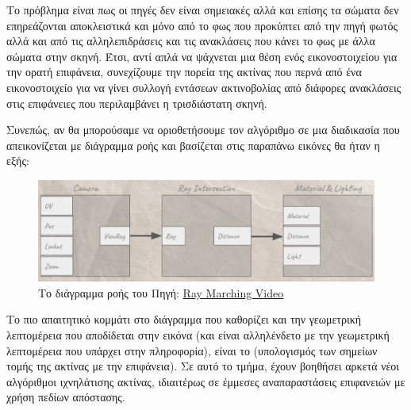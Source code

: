     Το πρόβλημα είναι πως οι πηγές δεν είναι σημειακές αλλά και επίσης τα σώματα δεν επηρεάζονται αποκλειστικά και μόνο από το φως που προκύπτει από την πηγή φωτός αλλά και από τις αλληλεπιδράσεις και τις ανακλάσεις που κάνει το φως με άλλα σώματα στην σκηνή. Έτσι, αντί απλά να ψάχνεται μια θέση ενός εικονοστοιχείου για την ορατή επιφάνεια, συνεχίζουμε την πορεία της ακτίνας που περνά από ένα εικονοστοιχείο για να γίνει συλλογή εντάσεων ακτινοβολίας από διάφορες ανακλάσεις στις επιφάνειες που περιλαμβάνει η τρισδιάστατη σκηνή. 
    
    
    Συνεπώς, αν θα μπορούσαμε να οριοθετήσουμε τον αλγόριθμο  σε μια διαδικασία που απεικονίζεται με διάγραμμα ροής και βασίζεται στις παραπάνω εικόνες θα ήταν η εξής:
    \begin{figure}[H]
        \centering
        \includegraphics[width=.6\linewidth]{images/chapter2_img/ray_tracing_pipline.jpg}
        \caption{Το διάγραμμα ροής του  Πηγή: \href{https://youtu.be/PGtv-dBi2wE?si=aUpxw89M65hnv-su}{Ray Marching Video}}
        \label{fig:ray_tracing_pipeline}
    \end{figure}
\par 
    Το πιο απαιτητικό κομμάτι στο διάγραμμα που καθορίζει και την γεωμετρική λεπτομέρεια που αποδίδεται στην εικόνα (και είναι αλληλένδετο με την γεωμετρική λεπτομέρεια που υπάρχει στην  πληροφορία), είναι το (υπολογισμός των σημείων τομής της ακτίνας με την επιφάνεια). Σε αυτό το τμήμα, έχουν βοηθήσει αρκετά νέοι αλγόριθμοι ιχνηλάτισης ακτίνας, ιδιαιτέρως σε έμμεσες αναπαραστάσεις επιφανειών με χρήση πεδίων απόστασης. 

